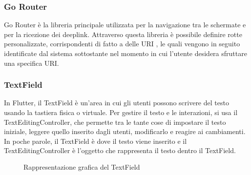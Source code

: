 \subsubsection{Go Router} \label{subsub:go_router}
Go Router \cite{gorouter_lib} è la libreria principale utilizzata per la navigazione tra le schermate e per la ricezione dei deeplink. Attraverso questa libreria è possibile definire rotte personalizzate, corrispondenti di fatto a delle URI \cite{uri}, le quali vengono in seguito identificate dal sistema sottostante nel momento in cui l'utente desidera sfruttare una specifica URI.

\subsubsection{TextField} \label{subsub:textfield}
In Flutter, il TextField \cite{textfield} è un'area in cui gli utenti possono scrivere del testo usando la tastiera fisica o virtuale. Per gestire il testo e le interazioni, si usa il TextEditingController, che permette tra le tante cose di impostare il testo iniziale, leggere quello inserito dagli utenti, modificarlo e reagire ai cambiamenti. In poche parole, il TextField è dove il testo viene inserito e il TextEditingController è l'oggetto che rappresenta il testo dentro il TextField.

\begin{figure}[H]
	\centering
	\caption{Rappresentazione grafica del TextField}
	\label{fig:textfield_verbose}
\end{figure}
\noindent

